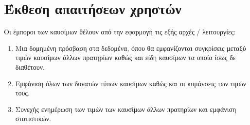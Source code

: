 \section{Έκθεση απαιτήσεων χρηστών}

Οι έμποροι των καυσίμων θέλουν από την εφαρμογή τις εξής αρχές / λειτουργίες:
\begin{enumerate}
	\item Μια δομημένη πρόσβαση στα δεδομένα, όπου θα εμφανίζονται συγκρίσεις μεταξύ τιμών καυσίμων άλλων πρατηρίων καθώς και είδη καυσίμων τα οποία ίσως δε διαθέτουν.
	\item Εμφάνιση όλων των δυνατών τύπων καυσίμων καθώς και οι κυμάνσεις των τιμών τους.
	\item Συνεχής ενημέρωση των τιμών των καυσίμων άλλων πρατηρίων και εμφάνιση στατιστικών.
	
\end{enumerate}



